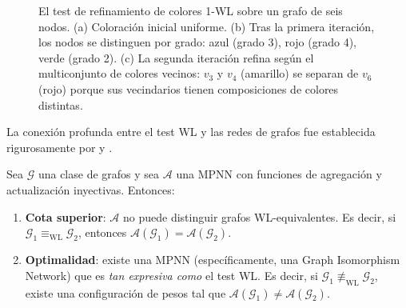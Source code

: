 \begin{figure}[h]
\caption[Refinamiento de colores Weisfeiler--Leman]{El test de refinamiento de
colores 1-WL sobre un grafo de seis nodos. (a) Coloraci\'on inicial uniforme.
(b) Tras la primera iteraci\'on, los nodos se distinguen por grado: azul (grado
3), rojo (grado 4), verde (grado 2). (c) La segunda iteraci\'on refina seg\'un el
multiconjunto de colores vecinos: $v_3$ y $v_4$ (amarillo) se separan de $v_6$
(rojo) porque sus vecindarios tienen composiciones de colores distintas.}
\label{fig:priors:wl}
\end{figure}

La conexi\'on profunda entre el test WL y las redes de grafos fue establecida
rigurosamente por \citet{xu2019how} y \citet{morris2019weisfeiler}.

\begin{theorem}
\label{thm:priors:wl-mpnn}
Sea $\mathcal{G}$ una clase de grafos y sea $\mathcal{A}$ una MPNN con funciones
de agregaci\'on y actualizaci\'on inyectivas. Entonces:
\begin{enumerate}
\item \textbf{Cota superior}: $\mathcal{A}$ no puede distinguir grafos
WL-equivalentes. Es decir, si
$\mathcal{G}_1 \equiv_{\mathrm{WL}} \mathcal{G}_2$, entonces
$\mathcal{A}(\mathcal{G}_1) = \mathcal{A}(\mathcal{G}_2)$.
\item \textbf{Optimalidad}: existe una MPNN (espec\'ificamente, una Graph
Isomorphism Network) que es \emph{tan expresiva como} el test WL. Es decir, si
$\mathcal{G}_1 \not\equiv_{\mathrm{WL}} \mathcal{G}_2$, existe una configuraci\'on
de pesos tal que
$\mathcal{A}(\mathcal{G}_1) \neq \mathcal{A}(\mathcal{G}_2)$.
\end{enumerate}
\end{theorem}

